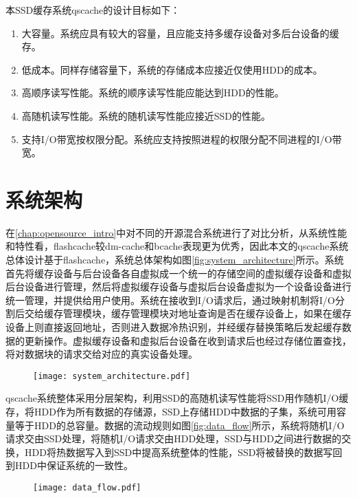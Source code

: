 本SSD缓存系统qscache的设计目标如下：

\begin{enumerate}
    \item 大容量。系统应具有较大的容量，且应能支持多缓存设备对多后台设备的缓存。
    \item 低成本。同样存储容量下，系统的存储成本应接近仅使用HDD的成本。
    \item 高顺序读写性能。系统的顺序读写性能应能达到HDD的性能。
    \item 高随机读写性能。系统的随机读写性能应接近SSD的性能。
    \item 支持I/O带宽按权限分配。系统应支持按照进程的权限分配不同进程的I/O带宽。

\end{enumerate}

\section{系统架构}
\label{sec:qscache_architecture}

在\ref{chap:opensource_intro}中对不同的开源混合系统进行了对比分析，从系统性能和特性看，flashcache较dm-cache和bcache表现更为优秀，因此本文的qscache系统总体设计基于flashcache，系统总体架构如图\ref{fig:system_architecture}所示。系统首先将缓存设备与后台设备各自虚拟成一个统一的存储空间的虚拟缓存设备和虚拟后台设备进行管理，然后将虚拟缓存设备与虚拟后台设备虚拟为一个设备设备进行统一管理，并提供给用户使用。系统在接收到I/O请求后，通过映射机制将I/O分割后交给缓存管理模块，缓存管理模块对地址查询是否在缓存设备上，如果在缓存设备上则直接返回地址，否则进入数据冷热识别，并经缓存替换策略后发起缓存数据的更新操作。虚拟缓存设备和虚拟后台设备在收到请求后也经过存储位置查找，将对数据块的请求交给对应的真实设备处理。

\begin{figure}[H]
    \centering
    \texttt{[image: system\_architecture.pdf]}
\end{figure}

qscache系统整体采用分层架构，利用SSD的高随机读写性能将SSD用作随机I/O缓存，将HDD作为所有数据的存储源，SSD上存储HDD中数据的子集，系统可用容量等于HDD的总容量。数据的流动规则如图\ref{fig:data_flow}所示，系统将随机I/O请求交由SSD处理，将随机I/O请求交由HDD处理，SSD与HDD之间进行数据的交换，HDD将热数据写入到SSD中提高系统整体的性能，SSD将被替换的数据写回到HDD中保证系统的一致性。

\begin{figure}[H]
    \centering
    \texttt{[image: data\_flow.pdf]}
\end{figure}

